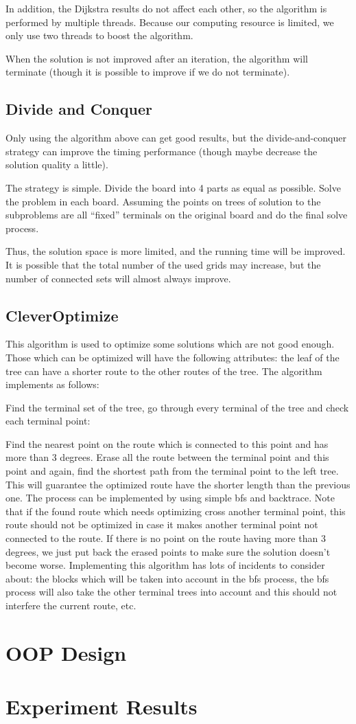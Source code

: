 \documentclass[12pt, a4paper]{article}
\begin{document}
	In addition, the Dijkstra results do not affect each other, so the algorithm is performed by multiple threads. Because our computing resource is limited, we only use two threads to boost the algorithm.
	
	When the solution is not improved after an iteration, the algorithm will terminate (though it is possible to improve if we do not terminate).
	
	\subsection{Divide and Conquer}
	
	Only using the algorithm above can get good results, but the divide-and-conquer strategy can improve the timing performance (though maybe decrease the solution quality a little).
	
	The strategy is simple. Divide the board into 4 parts as equal as possible. Solve the problem in each board. Assuming the points on trees of solution to the subproblems are all ``fixed'' terminals on the original board and do the final solve process.
	
	Thus, the solution space is more limited, and the running time will be improved. It is possible that the total number of the used grids may increase, but the number of connected sets will almost always improve.
	
	\subsection{CleverOptimize}
		
		This algorithm is used to optimize some solutions which are not good enough. Those which can be optimized will have the following attributes: the leaf of the tree can have a shorter route to the other routes of the tree. The algorithm implements as follows:
		
		Find the terminal set of the tree, go through every terminal of the tree and check each terminal point:
			
			Find the nearest point on the route which is connected to this point and has more than 3 degrees. Erase all the route between the terminal point and this point and again, find the shortest path from the terminal point to the left tree. This will guarantee the optimized route have the shorter length than the previous one. The process can be implemented by using simple bfs and backtrace. Note that if the found route which needs optimizing cross another terminal point, this route should not be optimized in case it makes another terminal point not connected to the route. If there is no point on the route having more than 3 degrees, we just put back the erased points to make sure the solution doesn't become worse. Implementing this algorithm has lots of incidents to consider about: the blocks which will be taken into account in the bfs process, the bfs process will also take the other terminal trees into account and this should not interfere the current route, etc.
	
	\section{OOP Design}
	
	\section{Experiment Results}
	
\end{document}
